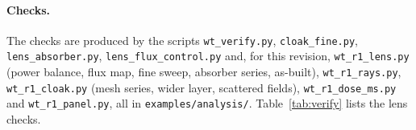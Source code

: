 \paragraph{Checks.} The checks are produced by the scripts \texttt{wt\_\allowbreak verify.py},
\texttt{cloak\_\allowbreak fine.py}, \texttt{lens\_\allowbreak absorber.py},
\texttt{lens\_\allowbreak flux\_\allowbreak control.py} and, for this revision, \texttt{wt\_\allowbreak r1\_\allowbreak lens.py}
(power balance, flux map, fine sweep, absorber series, as-built), \texttt{wt\_\allowbreak r1\_\allowbreak rays.py},
\texttt{wt\_\allowbreak r1\_\allowbreak cloak.py} (mesh series, wider layer, scattered fields),
\texttt{wt\_\allowbreak r1\_\allowbreak dose\_\allowbreak ms.py} and \texttt{wt\_\allowbreak r1\_\allowbreak panel.py}, all in
\texttt{examples/\allowbreak analysis/}. Table~\ref{tab:verify} lists the lens checks.
